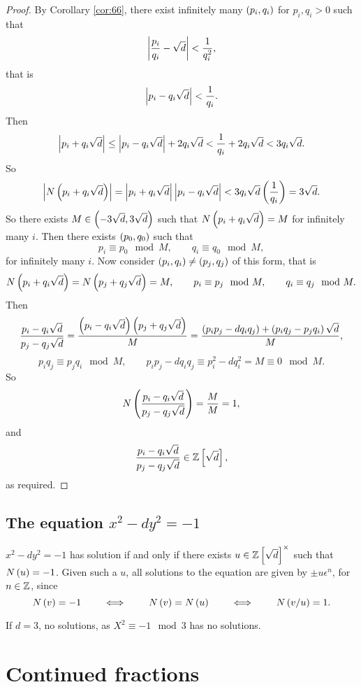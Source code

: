 \begin{proof}
By Corollary \ref{cor:66}, there exist infinitely many $ \left( p_i, q_i \right) $ for $ p_i, q_i > 0 $ such that
$$ \left\lvert \dfrac{p_i}{q_i} - \sqrt{d} \right\rvert < \dfrac{1}{q_i^2}, $$
that is
$$ \left\lvert p_i - q_i\sqrt{d} \right\rvert < \dfrac{1}{q_i}. $$
Then
$$ \left\lvert p_i + q_i\sqrt{d} \right\rvert \le \left\lvert p_i - q_i\sqrt{d} \right\rvert + 2q_i\sqrt{d} < \dfrac{1}{q_i} + 2q_i\sqrt{d} < 3q_i\sqrt{d}. $$
So
$$ \left\lvert N\left( p_i + q_i\sqrt{d} \right) \right\rvert = \left\lvert p_i + q_i\sqrt{d} \right\rvert\left\lvert p_i - q_i\sqrt{d} \right\rvert < 3q_i\sqrt{d}\left( \dfrac{1}{q_i} \right) = 3\sqrt{d}. $$
So there exists $ M \in \left( -3\sqrt{d}, 3\sqrt{d} \right) $ such that $ N\left( p_i + q_i\sqrt{d} \right) = M $ for infinitely many $ i $. Then there exists $ \left( p_0, q_0 \right) $ such that
$$ p_i \equiv p_0 \mod M, \qquad q_i \equiv q_0 \mod M, $$
for infinitely many $ i $. Now consider $ \left( p_i, q_i \right) \ne \left( p_j, q_j \right) $ of this form, that is
$$ N\left( p_i + q_i\sqrt{d} \right) = N\left( p_j + q_j\sqrt{d} \right) = M, \qquad p_i \equiv p_j \mod M, \qquad q_i \equiv q_j \mod M. $$
Then
$$ \dfrac{p_i - q_i\sqrt{d}}{p_j - q_j\sqrt{d}} = \dfrac{\left( p_i - q_i\sqrt{d} \right)\left( p_j + q_j\sqrt{d} \right)}{M} = \dfrac{\left( p_ip_j - dq_iq_j \right) + \left( p_iq_j - p_jq_i \right)\sqrt{d}}{M}, $$
$$ p_iq_j \equiv p_jq_i \mod M, \qquad p_ip_j - dq_iq_j \equiv p_i^2 - dq_i^2 = M \equiv 0 \mod M. $$
So
$$ N\left( \dfrac{p_i - q_i\sqrt{d}}{p_j - q_j\sqrt{d}} \right) = \dfrac{M}{M} = 1, $$
and
$$ \dfrac{p_i - q_i\sqrt{d}}{p_j - q_j\sqrt{d}} \in \mathbb{Z}\left[ \sqrt{d} \right], $$
as required.
\end{proof}


\subsection{The equation $ x^2 - dy^2 = - 1 $}

$ x^2 - dy^2 = -1 $ has solution if and only if there exists $ u \in \mathbb{Z}\left[ \sqrt{d} \right]^\times $ such that $ N\left( u \right) = -1 $. Given such a $ u $, all solutions to the equation are given by $ \pm u\epsilon^n $, for $ n \in \mathbb{Z} $, since
$$ N\left( v \right) = -1 \qquad \iff \qquad N\left( v \right) = N\left( u \right) \qquad \iff \qquad N\left( v / u \right) = 1. $$

\begin{example2}
If $ d = 3 $, no solutions, as $ X^2 \equiv -1 \mod 3 $ has no solutions.
\end{example2}

\pagebreak

\section{Continued fractions}

